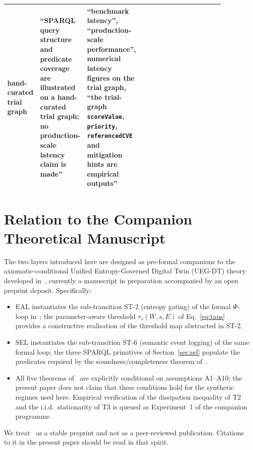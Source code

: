 \documentclass[futureinternet,article,submit,pdftex,moreauthors]{Definitions/mdpi}
\newcommand{\psiop}{\ensuremath{\Psi}}
\newcommand{\taus}{\ensuremath{\tau_{s}}}
\begin{document}
\begin{table}[t]
\begin{tabular}{@{}p{0.015\linewidth}p{0.20\linewidth}p{0.08\linewidth}p{0.13\linewidth}p{0.26\linewidth}p{0.20\linewidth}@{}}
    hand-curated trial graph
  & ``SPARQL query structure and predicate coverage are illustrated on
    a hand-curated trial graph; no production-scale latency claim is
    made''
  & ``benchmark latency'', ``production-scale performance'',
    numerical latency figures on the trial graph,
    ``the trial-graph \texttt{scoreValue}, \texttt{priority},
    \texttt{referencedCVE} and mitigation hints are empirical outputs''
    \\
\bottomrule
\end{tabular}
\end{table}

\section{Relation to the Companion Theoretical Manuscript}
\label{sec:theory}

The two layers introduced here are designed as pre-formal companions to
the axiomatic-conditional Unified Entropy-Governed Digital Twin
(UEG-DT) theory developed in~\cite{paper5}, currently a manuscript in
preparation accompanied by an open preprint deposit. Specifically:

\begin{itemize}[leftmargin=*]
  \item EAL instantiates the sub-transition ST-2 (entropy gating) of
        the formal $\psiop$-loop in~\cite{paper5}; the parameter-aware
        threshold $\taus(W, s, E)$ of Eq.~\eqref{eq:taus} provides a
        constructive realisation of the threshold map abstracted in
        ST-2.
  \item SEL instantiates the sub-transition ST-6 (semantic event
        logging) of the same formal loop; the three SPARQL primitives
        of Section~\ref{sec:sel} populate the predicates required by
        the soundness/completeness theorem of~\cite{paper5}.
  \item All five theorems of~\cite{paper5} are explicitly conditional
        on assumptions A1--A10; the present paper does not claim that
        these conditions hold for the synthetic regimes used here.
        Empirical verification of the dissipation inequality of T2 and
        the i.i.d.\ stationarity of T3 is queued as Experiment~1 of the
        companion programme.
\end{itemize}

\noindent We treat~\cite{paper5} as a stable preprint and not as a
peer-reviewed publication. Citations to it in the present paper should
be read in that spirit.
\end{document}
